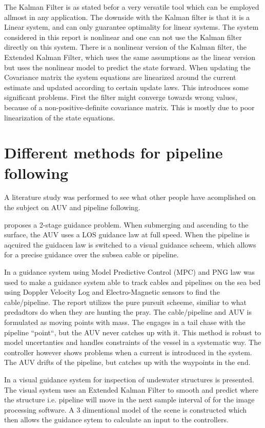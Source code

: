 	The Kalman Filter is as stated befor a very versatile tool which can be employed allmost in any application. The downside with the Kalman filter is that it is a Linear system, and can only guarantee optimality for linear systems. The system considered in this report is nonlinear and one can not use the Kalman filter directly on this system. There is a nonlinear version of the Kalman filter, the Extended Kalman Filter, which uses the same assumptions as the linear version but uses the nonlinear model to predict the state forward. When updating the Covariance matrix the system equations are linearized around the current estimate and updated according to certain update laws. This introduces some significant problems. First the filter might converge towards wrong values, because of a non-positive-definite covariance matrix. This is mostly due to poor linearization of the state equations. \cite{kalman}
	
	
\section{Different methods for pipeline following}
	A literature study was performed to see what other people have acomplished on the subject on AUV and pipeline following. 
	
	\cite{GuidanceReview} proposes a 2-stage guidance problem. When submerging and ascending to the surface, the AUV uses a LOS guidance law at full speed. When the pipeline is aqcuired the guidacen law is switched to a visual guidance scheem, which allows for a precise guidance over the subsea cable or pipeline. 
		
	In \cite{MPC_pure_pursuit} a guidance system using Model Predictive Control (MPC) and PNG law was used to make a guidance system able to track cables and pipelines on the sea bed using Doppler Velocity Log and Electro-Magnetic sensors to find the cable/pipeline. The report utilizes the pure pursuit scheeme, similiar to what predadtors do when they are hunting the pray. The cable/pipeline and AUV is formulated as moving points with mass. The engages in a tail chase with the pipeline ``point``, but the AUV never catches up with it. This method is robust to model uncertanties and handles constraints of the vessel in a systematic way. The controller however shows problems when a current is introduced in the system. The AUV drifts of the pipeline, but catches up with the waypoints in the end.
	
	In \cite{Visual_inpsection_of_seabottom_by_AUV} a visual guidance system for inspection of undewater structures is presented. The visual system uses an Extended Kalman Filter to smooth and predict where the structure i.e. pipeline will move in the next sample interval of for the image processing software. A 3 dimentional model of the scene is constructed which then allows the guidance sytem to calculate an input to the controllers.
	
